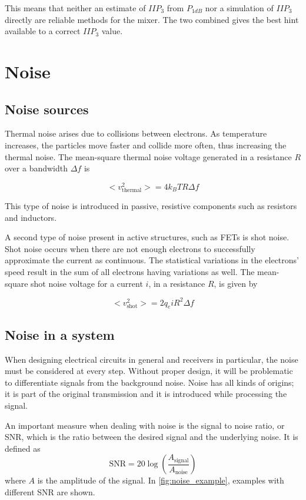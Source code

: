 			This means that neither an estimate of $IIP_3$ from $P_{1dB}$ nor a simulation of $IIP_3$ directly are reliable methods for the mixer. The two combined gives the best hint available to a correct $IIP_3$ value.

	\section{Noise}
		\subsection{Noise sources}\label{sec:noise_thermal}
			Thermal noise arises due to collisions between electrons. As temperature increases, the particles move faster and collide more often, thus increasing the thermal noise. The mean-square thermal noise voltage generated in a resistance $R$ over a bandwidth $\Delta f$ is \autocite{bahl03}

			\begin{equation}
				< v^2_\text{thermal} > = 4k_BTR\Delta f
			\end{equation}

			This type of noise is introduced in passive, resistive components such as resistors and inductors.

			A second type of noise present in active structures, such as FETs is shot noise. Shot noise occurs when there are not enough electrons to successfully approximate the current as continuous. The statistical variations in the electrons' speed result in the sum of all electrons having variations as well. The mean-square shot noise voltage for a current $i$, in a resistance $R$, is given by
			
			\begin{equation}
				< v^2_\text{shot} > = 2q_eiR^2\Delta f
			\end{equation}

		\subsection{Noise in a system}
			When designing electrical circuits in general and receivers in particular, the noise must be considered at every step. Without proper design, it will be problematic to differentiate signals from the background noise. Noise has all kinds of origins; it is part of the original transmission and it is introduced while processing the signal.

			An important measure when dealing with noise is the signal to noise ratio, or SNR, which is the ratio between the desired signal and the underlying noise. It is defined as
			\begin{equation}
					\text{SNR}=20\log \left(\frac{ A_\text{signal} }{ A_\text{noise} }\right)
			\end{equation}
			where $A$ is the amplitude of the signal. In \autoref{fig:noise_example}, examples with different SNR are shown.

